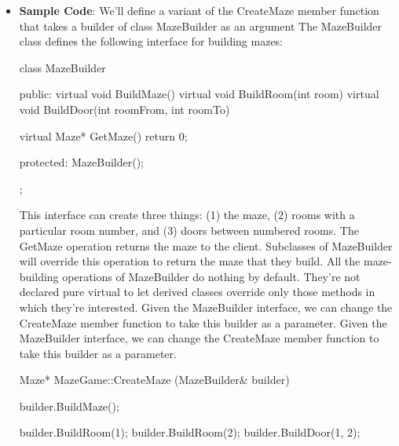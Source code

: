 \documentclass{report}
\begin{document}
\begin{itemize}
\begin{enumerate}
                        \bigbreak \noindent 
                        If the base class methods are virtual but not pure virtual, then they already have implementations. A derived class may override only the ones it wants, and it can still be instantiated.
                \end{enumerate}
            \item \textbf{Sample Code}: We'll define a variant of the CreateMaze member function that takes a builder of class MazeBuilder as an argument
                \bigbreak \noindent 
                The MazeBuilder class defines the following interface for building mazes:
                \bigbreak \noindent 
                \begin{cppcode}
                    class MazeBuilder {
                    public:
                        virtual void BuildMaze() { }
                        virtual void BuildRoom(int room) { }
                        virtual void BuildDoor(int roomFrom, int roomTo) { }

                        virtual Maze* GetMaze() { return 0; }

                    protected:
                        MazeBuilder();
                    };
                \end{cppcode}
                \bigbreak \noindent 
                This interface can create three things: (1) the maze, (2) rooms with a particular room number, and (3) doors between numbered rooms. The GetMaze operation returns the maze to the client. Subclasses of MazeBuilder will override this operation to return the maze that they build.
                \bigbreak \noindent 
                All the maze-building operations of MazeBuilder do nothing by default. They're not declared pure virtual to let derived classes override only those methods in which they're interested.
                \bigbreak \noindent 
                Given the MazeBuilder interface, we can change the CreateMaze member function to take this builder as a parameter.
                \bigbreak \noindent 
                Given the MazeBuilder interface, we can change the CreateMaze member function to take this builder as a parameter.
                \bigbreak \noindent 
                \begin{cppcode}
                    Maze* MazeGame::CreateMaze (MazeBuilder& builder) {
                        builder.BuildMaze();

                        builder.BuildRoom(1);
                        builder.BuildRoom(2);
                        builder.BuildDoor(1, 2);

}
\end{cppcode}
\end{itemize}
\end{document}
